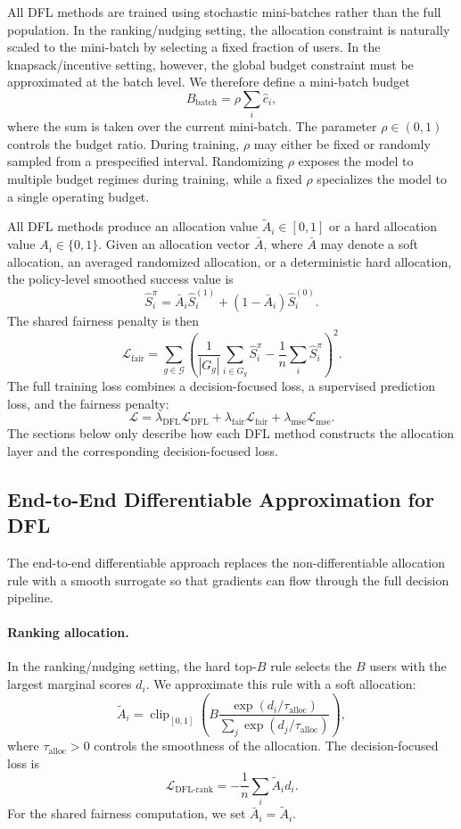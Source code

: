 All DFL methods are trained using stochastic mini-batches rather than the full population. In the ranking/nudging setting, the allocation constraint is naturally scaled to the mini-batch by selecting a fixed fraction of users. In the knapsack/incentive setting, however, the global budget constraint must be approximated at the batch level. We therefore define a mini-batch budget
\[
B_{\text{batch}}
=
\rho \sum_i \hat c_i,
\]
where the sum is taken over the current mini-batch. The parameter $\rho \in (0,1)$ controls the budget ratio. During training, $\rho$ may either be fixed or randomly sampled from a prespecified interval. Randomizing $\rho$ exposes the model to multiple budget regimes during training, while a fixed $\rho$ specializes the model to a single operating budget.

All DFL methods produce an allocation value $\tilde A_i \in [0,1]$ or a hard allocation value $A_i \in \{0,1\}$. Given an allocation vector $\bar A$, where $\bar A$ may denote a soft allocation, an averaged randomized allocation, or a deterministic hard allocation, the policy-level smoothed success value is
\[
\hat{S}_i^\pi
=
\bar A_i \hat{S}_i^{(1)}
+
(1-\bar A_i)\hat{S}_i^{(0)}.
\]
The shared fairness penalty is then
\[
\mathcal{L}_{\text{fair}}
=
\sum_{g\in\mathcal{G}}
\left(
\frac{1}{|G_g|}
\sum_{i\in G_g}
\hat{S}_i^\pi
-
\frac{1}{n}
\sum_i
\hat{S}_i^\pi
\right)^2.
\]
The full training loss combines a decision-focused loss, a supervised prediction loss, and the fairness penalty:
\[
\mathcal{L}
=
\lambda_{\text{DFL}}\mathcal{L}_{\text{DFL}}
+
\lambda_{\text{fair}}\mathcal{L}_{\text{fair}}
+
\lambda_{\text{mse}}\mathcal{L}_{\text{mse}}.
\]
The sections below only describe how each DFL method constructs the allocation layer and the corresponding decision-focused loss.

\subsection{End-to-End Differentiable Approximation for DFL}
The end-to-end differentiable approach replaces the non-differentiable allocation rule with a smooth surrogate so that gradients can flow through the full decision pipeline.

\paragraph{Ranking allocation.}
In the ranking/nudging setting, the hard top-$B$ rule selects the $B$ users with the largest marginal scores $d_i$. We approximate this rule with a soft allocation:
\[
\tilde{A}_i
=
\operatorname{clip}_{[0,1]}
\left(
B
\frac{\exp(d_i/\tau_{\text{alloc}})}
{\sum_j \exp(d_j/\tau_{\text{alloc}})}
\right),
\]
where $\tau_{\text{alloc}}>0$ controls the smoothness of the allocation. The decision-focused loss is
\[
\mathcal{L}_{\text{DFL-rank}}
=
-
\frac{1}{n}
\sum_i \tilde{A}_i d_i.
\]
For the shared fairness computation, we set $\bar A_i=\tilde A_i$.

